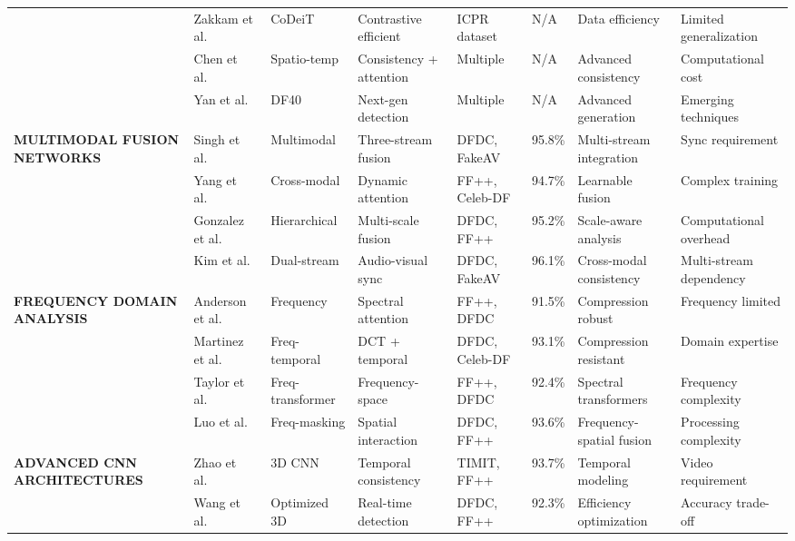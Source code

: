 \documentclass[conference]{IEEEtran}
\begin{document}
\begin{table*}[!htbp]
\begin{tabular}{|p{2.5cm}|p{2.0cm}|p{1.6cm}|p{2.0cm}|p{1.6cm}|p{0.7cm}|p{2.0cm}|p{2.0cm}|}
& Zakkam et al.~\cite{zakkam2024codeit} & CoDeiT & Contrastive efficient & ICPR dataset & N/A & Data efficiency & Limited generalization \\ \cline{2-8}
& Chen et al.~\cite{chen2025deepfake} & Spatio-temp & Consistency + attention & Multiple & N/A & Advanced consistency & Computational cost \\ \cline{2-8}
& Yan et al.~\cite{yan2024df40} & DF40 & Next-gen detection & Multiple & N/A & Advanced generation & Emerging techniques \\ \hline
\multirow{4}{2.5cm}{\textbf{MULTIMODAL FUSION NETWORKS}} & Singh et al.~\cite{singh2024multimodal} & Multimodal & Three-stream fusion & DFDC, FakeAV & 95.8\% & Multi-stream integration & Sync requirement \\ \cline{2-8}
& Yang et al.~\cite{yang2024crossmodal} & Cross-modal & Dynamic attention & FF++, Celeb-DF & 94.7\% & Learnable fusion & Complex training \\ \cline{2-8}
& Gonzalez et al.~\cite{gonzalez2024hierarchical} & Hierarchical & Multi-scale fusion & DFDC, FF++ & 95.2\% & Scale-aware analysis & Computational overhead \\ \cline{2-8}
& Kim et al.~\cite{kim2025dual} & Dual-stream & Audio-visual sync & DFDC, FakeAV & 96.1\% & Cross-modal consistency & Multi-stream dependency \\ \hline
\multirow{4}{2.5cm}{\textbf{FREQUENCY DOMAIN ANALYSIS}} & Anderson et al.~\cite{anderson2024spectral} & Frequency & Spectral attention & FF++, DFDC & 91.5\% & Compression robust & Frequency limited \\ \cline{2-8}
& Martinez et al.~\cite{martinez2024frequency} & Freq-temporal & DCT + temporal & DFDC, Celeb-DF & 93.1\% & Compression resistant & Domain expertise \\ \cline{2-8}
& Taylor et al.~\cite{taylor2024frequency} & Freq-transformer & Frequency-space & FF++, DFDC & 92.4\% & Spectral transformers & Frequency complexity \\ \cline{2-8}
& Luo et al.~\cite{luo2025frequency} & Freq-masking & Spatial interaction & DFDC, FF++ & 93.6\% & Frequency-spatial fusion & Processing complexity \\ \hline
\multirow{7}{2.5cm}{\textbf{ADVANCED CNN ARCHITECTURES}} & Zhao et al.~\cite{zhao2024temporal} & 3D CNN & Temporal consistency & TIMIT, FF++ & 93.7\% & Temporal modeling & Video requirement \\ \cline{2-8}
& Wang et al.~\cite{wang2024efficient} & Optimized 3D & Real-time detection & DFDC, FF++ & 92.3\% & Efficiency optimization & Accuracy trade-off \\ \cline{2-8}

\end{tabular}
\end{table*}
\end{document}
